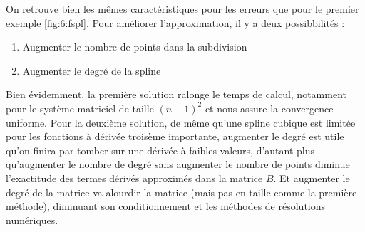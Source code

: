 On retrouve bien les mêmes caractéristiques pour les erreurs que pour le premier exemple \ref{fig:6:fspl}. Pour améliorer l'approximation,
il y a deux possibbilités :
\begin{enumerate}
\item Augmenter le nombre de points dans la subdivision
\item Augmenter le degré de la spline
\end{enumerate}
Bien évidemment, la première solution ralonge le temps de calcul, notamment pour le système matriciel de taille $(n-1)^2$ et nous assure la convergence
uniforme. Pour la deuxième solution, de même qu'une spline cubique est limitée pour les fonctions à dérivée troisème importante, augmenter le degré
est utile qu'on finira par tomber sur une dérivée à faibles valeurs, d'autant plus qu'augmenter le nombre de degré sans augmenter le nombre de points
diminue l'exactitude des termes dérivés approximés dans la matrice $B$. Et augmenter le degré de la matrice va alourdir la matrice (mais pas en taille
comme la première méthode), diminuant son conditionnement et les méthodes de résolutions numériques.